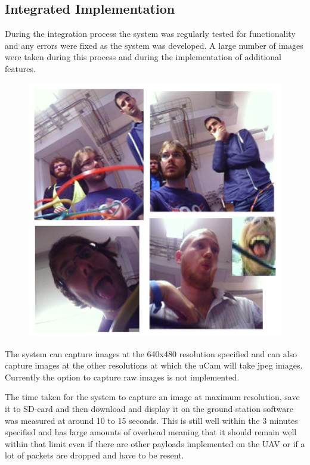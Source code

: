 \subsection{Integrated Implementation}

During the integration process the system was regularly tested for functionality and any errors were fixed as the system was developed. A large number of images were taken during this process and during the implementation of additional features.

\begin{figure}[H]
        \centering
        \includegraphics[width=1.00\textwidth]{figures/SampleImages1.png}
        \label{fig:Samples1}
\end{figure}

The system can capture images at the 640x480 resolution specified and can also capture images at the other resolutions at which the uCam will take jpeg images. Currently the option to capture raw images is not implemented.

The time taken for the system to capture an image at maximum resolution, save it to SD-card and then download and display it on the ground station software was measured at around 10 to 15 seconds. This is still well within the 3 minutes specified and has large amounts of overhead meaning that it should remain well within that limit even if there are other payloads implemented on the UAV or if a lot of packets are dropped and have to be resent.